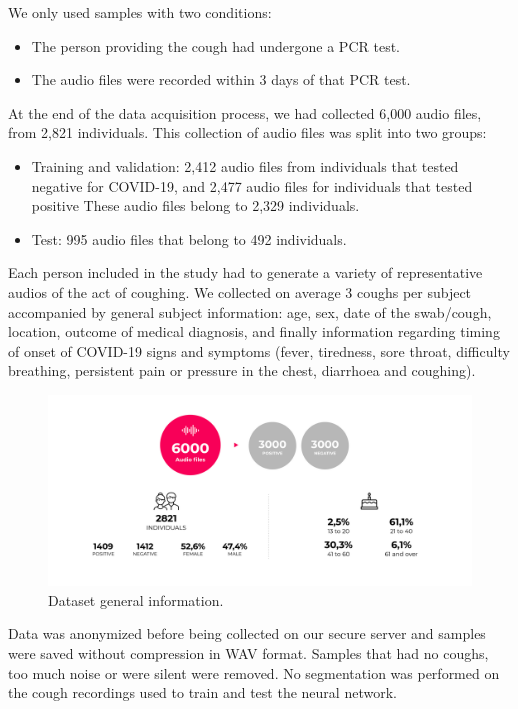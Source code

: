 \documentclass{nle}
\begin{document}
We only used samples with two conditions:
\begin{itemize}
    \item The person providing the cough had undergone a PCR test.
    \item The audio files were recorded within 3 days of that PCR test.
\end{itemize}

At the end of the data acquisition process, we had collected 6,000 audio files, from 2,821 individuals. This collection of audio files was split into two groups:
\begin{itemize}
    \item Training and validation: 2,412 audio files from individuals that tested negative for COVID-19, and 2,477 audio files for individuals that tested positive These audio files belong to 2,329 individuals.
    \item Test: 995 audio files that belong to 492 individuals.
\end{itemize}

Each person included in the study had to generate a variety of representative audios of the act of coughing. We collected on average 3 coughs per subject accompanied by general subject information: age, sex, date of the swab/cough, location, outcome of medical diagnosis, and finally information regarding timing of onset of COVID-19 signs and symptoms (fever, tiredness, sore throat, difficulty breathing, persistent pain or pressure in the chest, diarrhoea and coughing).

\begin{center}
\begin{figure}[htp]
    \centering
    \includegraphics[width=12cm]{DATASET}
    \caption{Dataset general information.}
    \label{fig:dataset}
\end{figure}
\end{center}

Data was anonymized before being collected on our secure server and samples were saved without compression in WAV format. Samples that had no coughs, too much noise or were silent were removed. No segmentation was performed on the cough recordings used to train and test the neural network.
\end{document}
